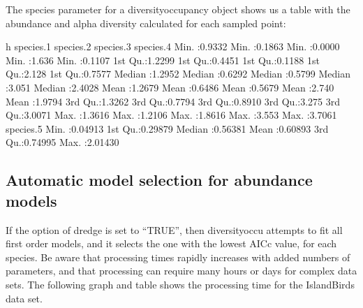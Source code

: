 \documentclass[article]{jss}
\begin{document}
The species parameter for a diversityoccupancy object shows us a table with the abundance and alpha diversity calculated for each sampled point:

\begin{CodeChunk}


\begin{CodeOutput}
       h            species.1        species.2        species.3       species.4     
 Min.   :0.9332   Min.   :0.1863   Min.   :0.0000   Min.   :1.636   Min.   :0.1107  
 1st Qu.:1.2299   1st Qu.:0.4451   1st Qu.:0.1188   1st Qu.:2.128   1st Qu.:0.7577  
 Median :1.2952   Median :0.6292   Median :0.5799   Median :3.051   Median :2.4028  
 Mean   :1.2679   Mean   :0.6486   Mean   :0.5679   Mean   :2.740   Mean   :1.9794  
 3rd Qu.:1.3262   3rd Qu.:0.7794   3rd Qu.:0.8910   3rd Qu.:3.275   3rd Qu.:3.0071  
 Max.   :1.3616   Max.   :1.2106   Max.   :1.8616   Max.   :3.553   Max.   :3.7061  
   species.5      
 Min.   :0.04913  
 1st Qu.:0.29879  
 Median :0.56381  
 Mean   :0.60893  
 3rd Qu.:0.74995  
 Max.   :2.01430  
\end{CodeOutput}
\end{CodeChunk}

\subsection{Automatic model selection for abundance
models}\label{automatic-model-selection-for-abundance-models}

If the option of dredge is set to ``TRUE'', then diversityoccu attempts
to fit all first order models, and it selects the one with the lowest
AICc value, for each species. Be aware that processing times rapidly
increases with added numbers of parameters, and that processing can
require many hours or days for complex data sets. The following graph
and table shows the processing time for the IslandBirds data set.
\end{document}
